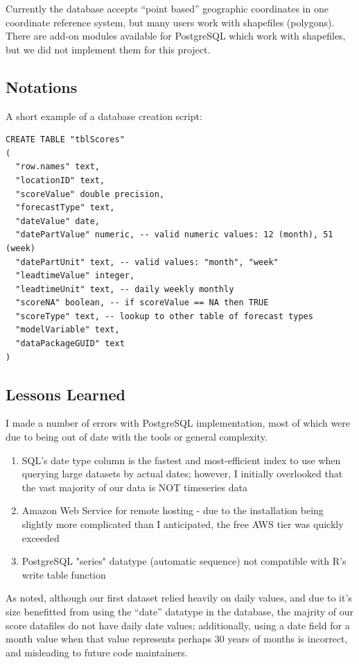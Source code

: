 \documentclass[logos,parttoc,morelanguage=french,morelanguage=german]{orsay-memoire}
\begin{document}
Currently the database accepts ``point based'' geographic coordinates in one coordinate reference system, but many users work with shapefiles (polygons). There are add-on modules available for PostgreSQL which work with shapefiles, but we did not implement them for this project.

\subsection{Notations}

A short example of a database creation script:
\begin{verbatim}
CREATE TABLE "tblScores"
(
  "row.names" text,
  "locationID" text,
  "scoreValue" double precision,
  "forecastType" text,
  "dateValue" date,
  "datePartValue" numeric, -- valid numeric values: 12 (month), 51 (week)
  "datePartUnit" text, -- valid values: "month", "week"
  "leadtimeValue" integer,
  "leadtimeUnit" text, -- daily weekly monthly
  "scoreNA" boolean, -- if scoreValue == NA then TRUE
  "scoreType" text, -- lookup to other table of forecast types
  "modelVariable" text,
  "dataPackageGUID" text
)
\end{verbatim}

\subsection{Lessons Learned}

I made a number of errors with PostgreSQL implementation, most of which were due to being out of date with the tools or general complexity.
%
%

\begin{enumerate}
\item SQL's date type column is the fastest and most-efficient index to use when querying large datasets by actual dates; however, I initially overlooked that the vast majority of our data is NOT timeseries data
\item Amazon Web Service for remote hosting - due to the installation being slightly more complicated than I anticipated, the free AWS tier was quickly exceeded
\item PostgreSQL "series" datatype (automatic sequence) not compatible with R's write table function
\end{enumerate}

As noted, although our first dataset relied heavily on daily values, and due to it's size benefitted from using the ``date'' datatype in the database, the majrity of our score datafiles do not have daily date values; additionally, using a date field for a month value when that value represents perhaps 30 years of months is incorrect, and misleading to future code maintainers.
\end{document}
